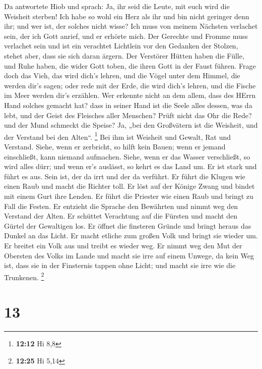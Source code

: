  Da antwortete Hiob und sprach:  Ja, ihr seid
die Leute, mit euch wird die Weisheit sterben!  Ich habe so
wohl ein Herz als ihr und bin nicht geringer denn ihr; und wer ist, der
solches nicht wisse?  Ich muss von meinem Nächsten verlachet
sein, der ich Gott anrief, und er erhörte mich. Der Gerechte und Fromme
muss verlachet sein  und ist ein verachtet Lichtlein vor den
Gedanken der Stolzen, stehet aber, dass sie sich daran ärgern.
 Der Verstörer Hütten haben die Fülle, und Ruhe haben, die
wider Gott toben, die ihren Gott in der Faust führen.  Frage
doch das Vieh, das wird dich's lehren, und die Vögel unter dem Himmel,
die werden dir's sagen;  oder rede mit der Erde, die wird
dich's lehren, und die Fische im Meer werden dir's erzählen.
 Wer erkennte nicht an dem allem, dass des HErrn Hand
solches gemacht hat?  dass in seiner Hand ist die Seele
alles dessen, was da lebt, und der Geist des Fleisches aller Menschen?
 Prüft nicht das Ohr die Rede? und der Mund schmeckt die
Speise?  Ja, „bei den Großvätern ist die Weisheit, und der
Verstand bei den Alten``. \footnote{\textbf{12:12} Hi 8,8} 
Bei ihm ist Weisheit und Gewalt, Rat und Verstand.  Siehe,
wenn er zerbricht, so hilft kein Bauen; wenn er jemand einschließt, kann
niemand aufmachen.  Siehe, wenn er das Wasser verschließt,
so wird alles dürr; und wenn er's auslässt, so kehrt es das Land um.
 Er ist stark und führt es aus. Sein ist, der da irrt und
der da verführt.  Er führt die Klugen wie einen Raub und
macht die Richter toll.  Er löst auf der Könige Zwang und
bindet mit einem Gurt ihre Lenden.  Er führt die Priester
wie einen Raub und bringt zu Fall die Festen.  Er entzieht
die Sprache den Bewährten und nimmt weg den Verstand der Alten.
 Er schüttet Verachtung auf die Fürsten und macht den
Gürtel der Gewaltigen los.  Er öffnet die finsteren Gründe
und bringt heraus das Dunkel an das Licht.  Er macht
etliche zum großen Volk und bringt sie wieder um. Er breitet ein Volk
aus und treibt es wieder weg.  Er nimmt weg den Mut der
Obersten des Volks im Lande und macht sie irre auf einem Unwege, da kein
Weg ist,  dass sie in der Finsternis tappen ohne Licht; und
macht sie irre wie die Trunkenen. \footnote{\textbf{12:25} Hi 5,14}

\hypertarget{section-2}{%
\section{13}\label{section-2}}

